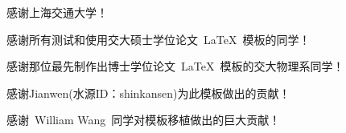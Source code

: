 
\begin{thanks}

  感谢上海交通大学！
  
  感谢所有测试和使用交大硕士学位论文~\LaTeX~模板的同学！

  感谢那位最先制作出博士学位论文~\LaTeX~模板的交大物理系同学！

  感谢Jianwen(水源ID：shinkansen)为此模板做出的贡献！

  感谢~William Wang~同学对模板移植做出的巨大贡献！


\end{thanks}

